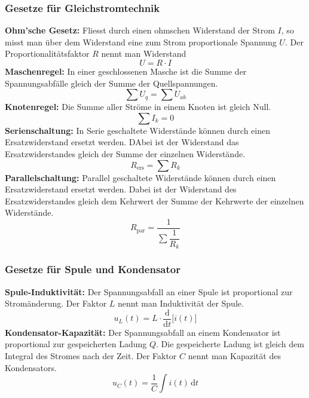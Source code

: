 \subsubsection{Gesetze für Gleichstromtechnik}
\textbf{Ohm'sche Gesetz:} Fliesst durch einen ohmschen Widerstand der Strom $I$, so misst man über dem Widerstand eine zum Strom proportionale Spannung $U$. Der Proportionalitätsfaktor $R$ nennt man Widerstand
\begin{equation}
\boxed{U=R\cdot I}
\end{equation}
\textbf{Maschenregel:} In einer geschlossenen Masche ist die Summe der Spannungsabfälle gleich der Summe der Quellspannungen.
\begin{equation}
\boxed{\displaystyle \sum U_q=\displaystyle \sum U_{ab}}
\end{equation}
\textbf{Knotenregel:} Die Summe aller Ströme in einem Knoten ist gleich Null.
\begin{equation}
\boxed{\displaystyle \sum I_k=0}
\end{equation}
\textbf{Serienschaltung:} In Serie geschaltete Widerstände können durch einen Ersatzwiderstand ersetzt werden. DAbei ist der Widerstand das Ersatzwiderstandes gleich der Summe der einzelnen Widerstände.
\begin{equation}
\boxed{R_{\text{ers}}=\displaystyle \sum R_k}
\end{equation}
\textbf{Parallelschaltung:} Parallel geschaltete Widerstände können durch einen Ersatzwiderstand ersetzt werden. Dabei ist der Widerstand des Ersatzwiderstandes gleich dem Kehrwert der Summe der Kehrwerte der einzelnen Widerstände.
\begin{equation}
\boxed{R_{\text{par}}=\dfrac{1}{\displaystyle \sum \dfrac{1}{R_k}}}
\end{equation}
\subsubsection{Gesetze für Spule und Kondensator}
\textbf{Spule-Induktivität:} Der Spannungsabfall an einer Spule ist proportional zur Stromänderung. Der Faktor $L$ nennt man Induktivität der Spule.
\begin{equation}
\boxed{u_L\left(t\right)=L\cdot \dfrac{\text{d}}{\text{d}t}\Big[i\left(t\right)\Big]}
\end{equation}
\textbf{Kondensator-Kapazität:} Der Spannungsabfall an einem Kondensator ist proportional zur gespeicherten Ladung $Q$. Die gespeicherte Ladung ist gleich dem Integral des Stromes nach der Zeit. Der Faktor $C$ nennt man Kapazität des Kondensators.
\begin{equation}
\boxed{u_C\left(t\right)=\dfrac{1}{C} \displaystyle \int i\left(t\right)\,\text{d}t}
\end{equation}
